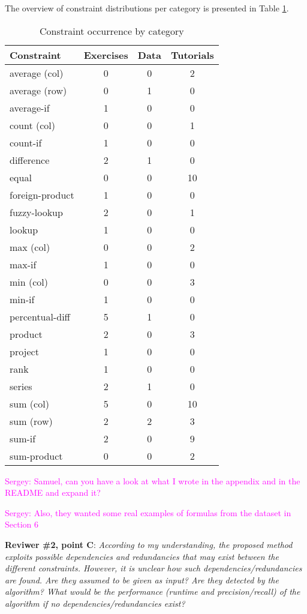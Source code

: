 \documentclass{article}
\newcommand{\sergey}[1]{\textcolor{magenta}{{\sc Sergey:} #1}\xspace}
\begin{document}
The overview of constraint distributions per category is presented in Table \ref{tab:constraint_by_category}.
\begin{table}
  \centering
  \caption{Constraint occurrence by category}
  \label{tab:constraint_by_category}
  \begin{tabular}{l | c c c }
    \textbf{Constraint} & \textbf{Exercises} & \textbf{Data} & \textbf{Tutorials}  \\\hline
    average (col) & 0 & 0 & 2 \\
    average (row) & 0 & 1 & 0 \\
    average-if    & 1 & 0 & 0 \\
    count (col) & 0 & 0 & 1 \\
    count-if & 1 & 0 & 0 \\
    difference & 2 & 1 & 0 \\
    equal & 0 & 0 & 10 \\
    foreign-product & 1 & 0 & 0 \\
    fuzzy-lookup & 2 & 0 & 1 \\
    lookup & 1 & 0 & 0 \\
    max (col) & 0 & 0 & 2 \\
    max-if & 1 & 0 & 0 \\
    min (col) & 0 & 0 & 3 \\
    min-if & 1 & 0 & 0 \\
    percentual-diff & 5 & 1 & 0 \\
    product & 2 & 0 & 3 \\
    project & 1 & 0 & 0 \\
    rank & 1 & 0 & 0 \\
    series & 2 & 1 & 0 \\
    sum (col) & 5 & 0 & 10 \\
    sum (row) & 2 & 2 & 3 \\
    sum-if & 2 & 0 & 9 \\
    sum-product & 0 & 0 & 2 \\
  \end{tabular}
\end{table}

\sergey{Samuel, can you have a look at what I wrote in the appendix and in the README and expand it?} 

\sergey{Also, they wanted some real examples of formulas from the dataset in Section 6}


\textbf{Reviwer \#2, point C}:  \textit{According to my understanding, the proposed method exploits possible dependencies and redundancies that may exist between the different constraints. However, it is unclear how such dependencies/redundancies are found. Are they assumed to be given as input? Are they detected by the algorithm? What would be the performance (runtime and precision/recall) of the algorithm if no dependencies/redundancies exist?}
\end{document}
